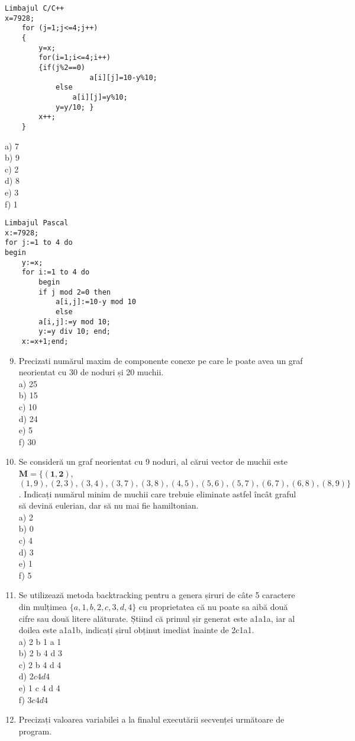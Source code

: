 \begin{verbatim}
Limbajul C/C++
x=7928;
    for (j=1;j<=4;j++)
    {
        y=x;
        for(i=1;i<=4;i++)
        {if(j%2==0)
                    a[i][j]=10-y%10;
            else
                a[i][j]=y%10;
            y=y/10; }
        x++;
    }
\end{verbatim}

a) 7\\
b) 9\\
c) 2\\
d) 8\\
e) 3\\
f) 1

\begin{verbatim}
Limbajul Pascal
x:=7928;
for j:=1 to 4 do
begin
    y:=x;
    for i:=1 to 4 do
        begin
        if j mod 2=0 then
            a[i,j]:=10-y mod 10
            else
        a[i,j]:=y mod 10;
        y:=y div 10; end;
    x:=x+1;end;
\end{verbatim}

\begin{enumerate}
  \setcounter{enumi}{8}
  \item Precizati numărul maxim de componente conexe pe care le poate avea un graf neorientat cu 30 de noduri și 20 muchii.\\
a) 25\\
b) 15\\
c) 10\\
d) 24\\
e) 5\\
f) 30
  \item Se consideră un graf neorientat cu 9 noduri, al cărui vector de muchii este $\mathbf{M}=\{(\mathbf{1 , 2})$, $(1,9),(2,3),(3,4),(3,7),(3,8),(4,5),(5,6),(5,7),(6,7),(6,8),(8,9)\}$. Indicați numărul minim de muchii care trebuie eliminate astfel încât graful să devină eulerian, dar să nu mai fie hamiltonian.\\
a) 2\\
b) 0\\
c) 4\\
d) 3\\
e) 1\\
f) 5
  \item Se utilizează metoda backtracking pentru a genera șiruri de câte 5 caractere din mulțimea $\{a, 1, b, 2, c, 3, d, 4\}$ cu proprietatea că nu poate sa aibă două cifre sau două litere alăturate. Știind că primul șir generat este a1a1a, iar al doilea este a1a1b, indicați șirul obținut imediat înainte de 2c1a1.\\
a) 2 b 1 a 1\\
b) 2 b 4 d 3\\
c) 2 b 4 d 4\\
d) $2 c 4 d 4$\\
e) 1 c 4 d 4\\
f) $3 c 4 d 4$
  \item Precizați valoarea variabilei a la finalul executării secvenței următoare de program.
\end{enumerate}

